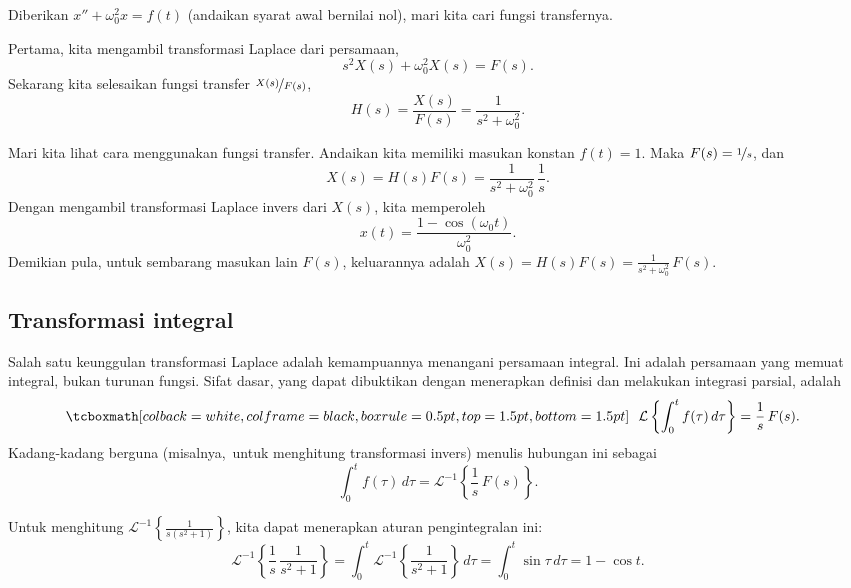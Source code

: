 \begin{example}
Diberikan $x'' + \omega_0^2 x = f(t)$ (andaikan syarat awal bernilai nol),
mari kita cari fungsi transfernya.

Pertama, kita mengambil transformasi Laplace dari persamaan,
\begin{equation*}
s^2 X(s) + \omega_0^2 X(s) = F(s) .
\end{equation*}
Sekarang kita selesaikan fungsi transfer $\nicefrac{X(s)}{F(s)}$,
\begin{equation*}
H(s) = \frac{X(s)}{F(s)} = \frac{1}{s^2 + \omega_0^2} .
\end{equation*}

Mari kita lihat cara menggunakan fungsi transfer.  Andaikan kita memiliki masukan konstan
$f(t) = 1$.  Maka $F(s) = \nicefrac{1}{s}$, dan
\begin{equation*}
X(s) = H(s) F(s) = \frac{1}{s^2+\omega_0^2} \, \frac{1}{s} .
\end{equation*}
Dengan mengambil transformasi Laplace invers dari $X(s)$, kita memperoleh
\begin{equation*}
x(t) = \frac{1-\cos(\omega_0 t)}{\omega_0^2} .
\end{equation*}
Demikian pula, untuk sembarang masukan lain $F(s)$, keluarannya adalah
$X(s) = H(s) F(s) = \frac{1}{s^2+\omega_0^2} \, F(s)$.
\end{example}

\subsection{Transformasi integral}

Salah satu keunggulan transformasi Laplace adalah kemampuannya menangani
persamaan integral.  Ini adalah persamaan yang memuat integral, bukan
turunan fungsi.  Sifat dasar, yang dapat dibuktikan
dengan menerapkan definisi dan melakukan integrasi parsial, adalah 
\begin{equation*}
\mybxbg{~~
\mathcal{L} \left\{
\int_0^t f(\tau) \, d\tau
\right\} = \frac{1}{s} \, F(s) .
~~}
\end{equation*}
Kadang-kadang berguna (misalnya,\ untuk menghitung transformasi invers) menulis
hubungan ini sebagai
\begin{equation*}
\int_0^t f(\tau) \, d\tau
=
{\mathcal{L}}^{-1} \left\{
\frac{1}{s} \, F(s) \right\} .
\end{equation*}

\begin{example}
Untuk menghitung ${\mathcal{L}}^{-1} \left\{\frac{1}{s(s^2+1)}\right\}$, kita dapat
menerapkan aturan pengintegralan ini:
\begin{equation*}
{\mathcal{L}}^{-1} \left\{
\frac{1}{s} \, \frac{1}{s^2+1} \right\} 
=
\int_0^t 
{\mathcal{L}}^{-1} \left\{
\frac{1}{s^2+1} \right\} \, d\tau
=
\int_0^t 
\sin \tau \, d\tau
=
1 - \cos t .
\end{equation*}
\end{example}



